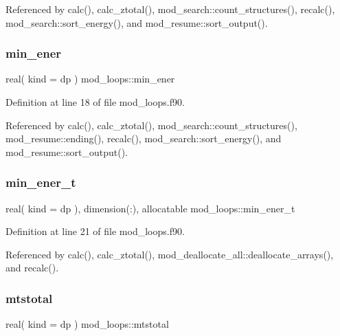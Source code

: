 Referenced by calc(), calc\+\_\+ztotal(), mod\+\_\+search\+::count\+\_\+structures(), recalc(), mod\+\_\+search\+::sort\+\_\+energy(), and mod\+\_\+resume\+::sort\+\_\+output().

\mbox{\label{namespacemod__loops_a17eba688dba567d251d70c4c22d9a1cb}} 
\subsubsection{\texorpdfstring{min\+\_\+ener}{min\_ener}}
{\footnotesize\ttfamily real( kind = dp ) mod\+\_\+loops\+::min\+\_\+ener}



Definition at line 18 of file mod\+\_\+loops.\+f90.



Referenced by calc(), calc\+\_\+ztotal(), mod\+\_\+search\+::count\+\_\+structures(), mod\+\_\+resume\+::ending(), recalc(), mod\+\_\+search\+::sort\+\_\+energy(), and mod\+\_\+resume\+::sort\+\_\+output().

\mbox{\label{namespacemod__loops_a285da08b33e0b132d883ee82f39f6ea2}} 
\subsubsection{\texorpdfstring{min\+\_\+ener\+\_\+t}{min\_ener\_t}}
{\footnotesize\ttfamily real( kind = dp ), dimension(\+:), allocatable mod\+\_\+loops\+::min\+\_\+ener\+\_\+t}



Definition at line 21 of file mod\+\_\+loops.\+f90.



Referenced by calc(), calc\+\_\+ztotal(), mod\+\_\+deallocate\+\_\+all\+::deallocate\+\_\+arrays(), and recalc().

\mbox{\label{namespacemod__loops_ae00fd72d753b56050294575eca6b68b1}} 
\subsubsection{\texorpdfstring{mtstotal}{mtstotal}}
{\footnotesize\ttfamily real( kind = dp ) mod\+\_\+loops\+::mtstotal}



